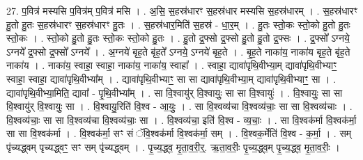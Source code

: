 \documentclass[17pt]{extarticle}
\begin{document}
27. प॒वित्र॑ मस्यसि प॒वित्र॑म् प॒वित्र॑ मसि । . अ॒सि॒ स॒हस्र॑धारꣳ स॒हस्र॑धार मस्यसि स॒हस्र॑धारम् । . स॒हस्र॑धारꣳ हु॒तो हु॒तः स॒हस्र॑धारꣳ स॒हस्र॑धारꣳ हु॒तः । . स॒हस्र॑धार॒मिति॑ स॒हस्र॑ - धा॒र॒म् । . हु॒तः स्तो॒कः स्तो॒को हु॒तो हु॒तः स्तो॒कः । . स्तो॒को हु॒तो हु॒तः स्तो॒कः स्तो॒को हु॒तः । . हु॒तो द्र॒फ्सो द्र॒फ्सो हु॒तो हु॒तो द्र॒फ्सः । . द्र॒फ्सो᳚ ऽग्नये॒ ऽग्नये᳚ द्र॒फ्सो द्र॒फ्सो᳚ ऽग्नये᳚ । . अ॒ग्नये॑ बृह॒ते बृ॑ह॒ते᳚ ऽग्नये॒ ऽग्नये॑ बृह॒ते । . बृ॒ह॒ते नाका॑य॒ नाका॑य बृह॒ते बृ॑ह॒ते नाका॑य । . नाका॑य॒ स्वाहा॒ स्वाहा॒ नाका॑य॒ नाका॑य॒ स्वाहा᳚ । . स्वाहा॒ द्यावा॑पृथि॒वीभ्या॒म् द्यावा॑पृथि॒वीभ्याꣳ॒॒ स्वाहा॒ स्वाहा॒ द्यावा॑पृथि॒वीभ्या᳚म् । . द्यावा॑पृथि॒वीभ्याꣳ॒॒ सा सा द्यावा॑पृथि॒वीभ्या॒म् द्यावा॑पृथि॒वीभ्याꣳ॒॒ सा । . द्यावा॑पृथि॒वीभ्या॒मिति॒ द्यावा᳚ - पृ॒थि॒वीभ्या᳚म् । . सा वि॒श्वायु॑र् वि॒श्वायुः॒ सा सा वि॒श्वायुः॑ । . वि॒श्वायुः॒ सा सा वि॒श्वायु॑र् वि॒श्वायुः॒ सा । . वि॒श्वायु॒रिति॑ वि॒श्व - आ॒युः॒ । . सा वि॒श्वव्य॑चा वि॒श्वव्य॑चाः॒ सा सा वि॒श्वव्य॑चाः । . वि॒श्वव्य॑चाः॒ सा सा वि॒श्वव्य॑चा वि॒श्वव्य॑चाः॒ सा । . वि॒श्वव्य॑चा॒ इति॑ वि॒श्व - व्य॒चाः॒ । . सा वि॒श्वक॑र्मा वि॒श्वक॑र्मा॒ सा सा वि॒श्वक॑र्मा । . वि॒श्वक॑र्मा॒ सꣳ सं ॅवि॒श्वक॑र्मा वि॒श्वक॑र्मा॒ सम् । . वि॒श्वक॒र्मेति॑ वि॒श्व - क॒र्मा॒ । . सम् पृ॑च्यद्ध्वम् पृच्यद्ध्वꣳ॒॒ सꣳ सम् पृ॑च्यद्ध्वम् । . पृ॒च्य॒द्ध्व॒ मृ॒ता॒व॒री॒र्॒. ऋ॒ता॒व॒रीः॒ पृ॒च्य॒द्ध्व॒म् पृ॒च्य॒द्ध्व॒ मृ॒ता॒व॒रीः॒ । \newline
\end{document}
